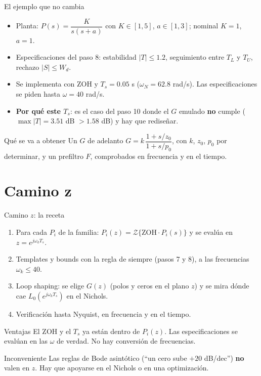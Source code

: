 \documentclass[aspectratio=169,11pt]{beamer}
\begin{document}
\begin{frame}{El ejemplo que no cambia}
  \small
  \begin{itemize}
    \item Planta: $P(s)=\dfrac{K}{s(s+a)}$ con $K\in[1,5]$, $a\in[1,3]$; nominal $K=1$, $a=1$.
    \item Especificaciones del paso 8: estabilidad $|T|\le1.2$, seguimiento entre $T_L$ y $T_U$, rechazo $|S|\le W_d$.
    \item Se implementa con ZOH y $T_s=0.05$ s ($\omega_N=62.8$ rad/s). Las especificaciones se piden hasta $\omega=40$ rad/s.
    \item \textbf{Por qué este $T_s$}: es el caso del paso 10 donde el $G$ emulado \textbf{no} cumple ($\max|T|=3.51$ dB $>1.58$ dB) y hay que rediseñar.
  \end{itemize}
  \begin{block}{Qué se va a obtener}
    Un $G$ de adelanto $G=k\,\dfrac{1+s/z_0}{1+s/p_0}$, con $k$, $z_0$, $p_0$ por determinar, y un prefiltro $F$, comprobados en frecuencia y en el tiempo.
  \end{block}
\end{frame}

\section{Camino z}
\begin{frame}{Camino $z$: la receta}
  \small
  \begin{enumerate}
    \item Para cada $P_i$ de la familia: $P_i(z)=\mathcal{Z}\{\mathrm{ZOH}\cdot P_i(s)\}$ y se evalúa en $z=e^{j\omega_kT_s}$.
    \item Templates y bounds con la regla de siempre (pasos 7 y 8), a las frecuencias $\omega_k\le40$.
    \item Loop shaping: se elige $G(z)$ (polos y ceros en el plano $z$) y se mira dónde cae $L_0(e^{j\omega_kT_s})$ en el Nichols.
    \item Verificación hasta Nyquist, en frecuencia y en el tiempo.
  \end{enumerate}
  \begin{block}{Ventajas}
    El ZOH y el $T_s$ ya están dentro de $P_i(z)$. Las especificaciones se evalúan en las $\omega$ de verdad. No hay conversión de frecuencias.
  \end{block}
  \begin{alertblock}{Inconveniente}
    Las reglas de Bode asintótico (``un cero sube $+20$ dB/dec'') \textbf{no} valen en $z$. Hay que apoyarse en el Nichols o en una optimización.
  \end{alertblock}
\end{frame}
\end{document}

